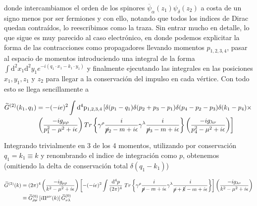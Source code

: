 \documentclass{article}
\numberwithin{equation}{section}
\begin{document}
donde intercambiamos el orden de los spinores $ \overline{\psi}_{\alpha}(z_1)\psi_{\delta}(z_{2}) $ a costa de un signo menos por ser fermiones y con ello, notando que todos los indices de Dirac quedan contraídos, lo reescribimos como la traza. Sin entrar mucho en detalle, lo que sigue es muy parecido al caso electrónico, en donde podemos explicitar la forma de las contracciones como propagadores llevando momentos $ p_{1,2,3,4} $, pasar al espacio de momentos introduciendo una integral de la forma $ \int \mathrm{d^2}x_1\mathrm{d^2}y_1 e^{-i\left(q_1 \cdot x_1-k_1 \cdot y_1 \right)}$ y finalmente ejecutando las integrales en las posiciones $ x_1, y_1, z_1 $ y $ z_2 $ para llegar a la conservación del impulso en cada vértice. Con todo esto se llega sencillamente a

\begin{equation}\label{key}
\begin{aligned}
\widetilde{G}^{(2)}(k_{1},q_{1})&=-(-ie)^{2} \int \mathrm{\mathrm{d^4}p_{1,2,3,4}}  \left[  \delta (p_1 -q_1) \delta(p_2 + p_3 - p_1) \delta (p_4 - p_2 - p_3) \delta (k_1 - p_4) \times \right.\\
& \left. \left(\frac{-ig_{\mu \rho}}{p_1^2 - \mu^2 +i\epsilon}\right) Tr\left\{ \gamma^{\rho} \frac{i}{\cancel{p}_2 -m+i\epsilon} \gamma^{\lambda} \frac{i}{\cancel{p}_3 -m +i\epsilon}   \right\} \left(\frac{-ig_{\lambda \nu}}{p_4^2 - \mu^2 +i\epsilon}\right)\right] 
\end{aligned}
\end{equation}

Integrando trivialmente en 3 de los 4 momentos, utilizando por conservación $ q_1=k_1 \equiv k $ y renombrando el indice de integración como $ p $, obtenemos (omitiendo la delta de conservación total $ \delta(q_1-k_1) $)

\begin{equation}\label{key}
\begin{aligned}
\widetilde{G}^{(2)}(k)&=(2\pi)^{4} \left(\frac{-ig_{\mu \rho}}{k^2 - \mu^2 +i\epsilon}\right) \left[-(-ie)^{2} \int \frac{\mathrm{d^4}p}{(2\pi)^4} \ Tr\left\{ \gamma^{\rho} \frac{i}{\cancel{p} -m+i\epsilon} \gamma^{\lambda} \frac{i}{\cancel{p} + \cancel{k} -m +i\epsilon}   \right\} \right]  \left(\frac{-ig_{\lambda \nu}}{k^2 - \mu^2 +i\epsilon}\right)\\
&\equiv \widetilde{G}^{(0)}_{\rho\mu} \left[ i \Pi^{\mu\nu}(k)\right] \widetilde{G}^{(0)}_{\nu\lambda} 
\end{aligned}
\end{equation}
\end{document}
